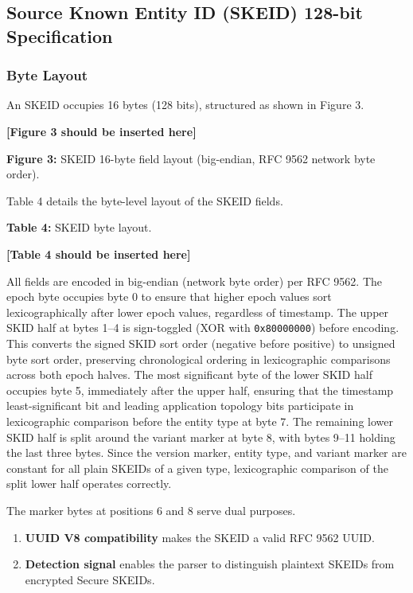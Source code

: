\documentclass[fleqn,10pt,lineno]{wlpeerj}
\providecommand{\tightlist}{%
  \setlength{\itemsep}{0pt}\setlength{\parskip}{0pt}}
\begin{document}
\subsection{Source Known Entity ID (SKEID) 128-bit
Specification}\label{source-known-entity-id-skeid-128-bit-specification}

\subsubsection{Byte Layout}\label{byte-layout}

An SKEID occupies 16 bytes (128 bits), structured as shown in Figure 3.

\textbf{{[}Figure 3 should be inserted here{]}}

\textbf{Figure 3:} SKEID 16-byte field layout (big-endian, RFC 9562
network byte order).

Table 4 details the byte-level layout of the SKEID fields.

\textbf{Table 4:} SKEID byte layout.

\textbf{{[}Table 4 should be inserted here{]}}

All fields are encoded in big-endian (network byte order) per RFC 9562.
The epoch byte occupies byte 0 to ensure that higher epoch values sort
lexicographically after lower epoch values, regardless of timestamp. The
upper SKID half at bytes 1--4 is sign-toggled (XOR with
\texttt{0x80000000}) before encoding. This converts the signed SKID sort
order (negative before positive) to unsigned byte sort order, preserving
chronological ordering in lexicographic comparisons across both epoch
halves. The most significant byte of the lower SKID half occupies byte
5, immediately after the upper half, ensuring that the timestamp
least-significant bit and leading application topology bits participate
in lexicographic comparison before the entity type at byte 7. The
remaining lower SKID half is split around the variant marker at byte 8,
with bytes 9--11 holding the last three bytes. Since the version marker,
entity type, and variant marker are constant for all plain SKEIDs of a
given type, lexicographic comparison of the split lower half operates
correctly.

The marker bytes at positions 6 and 8 serve dual purposes.

\begin{enumerate}
\def\labelenumi{\arabic{enumi}.}
\tightlist
\item
  \textbf{UUID V8 compatibility} makes the SKEID a valid RFC 9562 UUID.
\item
  \textbf{Detection signal} enables the parser to distinguish plaintext
  SKEIDs from encrypted Secure SKEIDs.
\end{enumerate}
\end{document}
